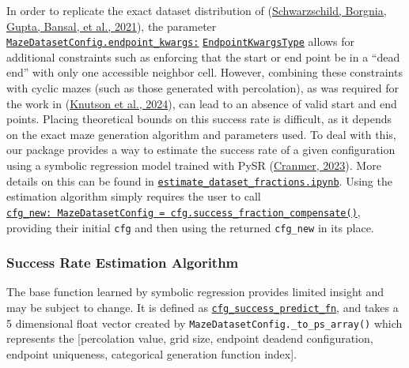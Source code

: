 \documentclass[10pt,a4paper,onecolumn]{article}
\begin{document}
In order to replicate the exact dataset distribution of
(\protect\hyperlink{ref-easy_to_hard}{Schwarzschild, Borgnia, Gupta,
Bansal, et al., 2021}), the parameter
\href{https://understanding-search.github.io/maze-dataset/maze_dataset/dataset/maze_dataset_config.html\#MazeDatasetConfig.endpoint_kwargs}{\texttt{MazeDatasetConfig.endpoint\_kwargs:}}
\href{https://understanding-search.github.io/maze-dataset/maze_dataset/dataset/maze_dataset_config.html\#EndpointKwargsType}{\texttt{EndpointKwargsType}}
allows for additional constraints such as enforcing that the start or
end point be in a ``dead end'' with only one accessible neighbor cell.
However, combining these constraints with cyclic mazes (such as those
generated with percolation), as was required for the work in
(\protect\hyperlink{ref-knutson2024logicalextrapolation}{Knutson et al.,
2024}), can lead to an absence of valid start and end points. Placing
theoretical bounds on this success rate is difficult, as it depends on
the exact maze generation algorithm and parameters used. To deal with
this, our package provides a way to estimate the success rate of a given
configuration using a symbolic regression model trained with PySR
(\protect\hyperlink{ref-pysr}{Cranmer, 2023}). More details on this can
be found in
\href{https://understanding-search.github.io/maze-dataset/notebooks/estimate_dataset_fractions.html}{\texttt{estimate\_dataset\_fractions.ipynb}}.
Using the estimation algorithm simply requires the user to call
\href{https://understanding-search.github.io/maze-dataset/maze_dataset.html\#MazeDatasetConfig.success_fraction_compensate}{\texttt{cfg\_new:\ MazeDatasetConfig\ =\ cfg.success\_fraction\_compensate()}},
providing their initial \texttt{cfg} and then using the returned
\texttt{cfg\_new} in its place.

\hypertarget{success-rate-estimation-algorithm}{%
\subsubsection{Success Rate Estimation
Algorithm}\label{success-rate-estimation-algorithm}}

The base function learned by symbolic regression provides limited
insight and may be subject to change. It is defined as
\href{https://understanding-search.github.io/maze-dataset/maze_dataset/dataset/success_predict_math.html\#cfg_success_predict_fn}{\texttt{cfg\_success\_predict\_fn}},
and takes a 5 dimensional float vector created by
\texttt{MazeDatasetConfig.\_to\_ps\_array()} which represents the
{[}percolation value, grid size, endpoint deadend configuration,
endpoint uniqueness, categorical generation function index{]}.
\end{document}
